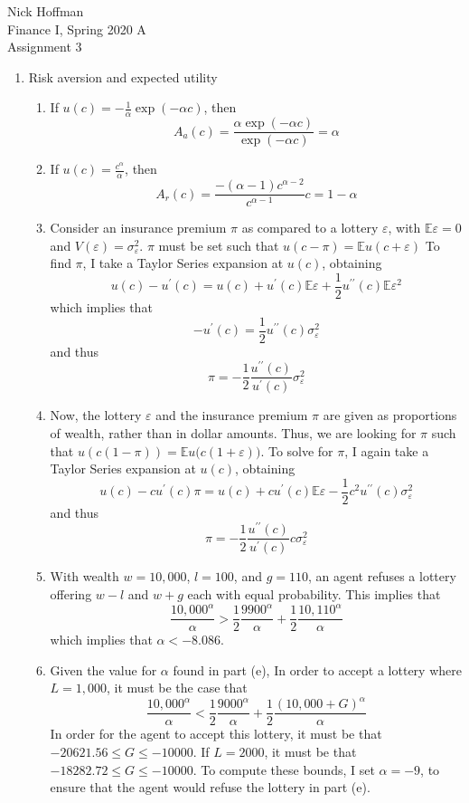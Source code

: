 \documentclass[11pt]{article}
\newcommand{\ev}{\mathbb{E}}
\begin{document}
\begin{flushleft}
	Nick Hoffman \\
	Finance I, Spring 2020 A \\
	Assignment 3 \\
\end{flushleft}

\begin{enumerate}
	\item Risk aversion and expected utility
	\begin{enumerate} 
		\item If \(u(c) = -\frac{1}{\alpha} \exp(-\alpha c)\), then
		\[A_a(c) = \frac{\alpha \exp(-\alpha c)}{\exp(-\alpha c)} = \alpha\]
		\item If \(u(c) = \frac{c^\alpha }{\alpha}\), then
		\[A_r(c) = \frac{-(\alpha - 1)c^{\alpha - 2}}{c^{\alpha - 1}}c = 1 - \alpha\]
		\item Consider an insurance premium \(\pi\) as compared to a lottery \(\varepsilon\), with \(\ev{\varepsilon} = 0\) and \(V(\varepsilon) = \sigma^2_\varepsilon\). \(\pi\) must be set such that \(u(c - \pi) = \ev{u(c + \varepsilon)}\) To find \(\pi\), I take a Taylor Series expansion at \(u(c)\), obtaining
		\[u(c) - u^\prime(c) = u(c) + u^\prime(c)\ev{\varepsilon} + \frac{1}{2}u^{\prime\prime}(c)\ev{\varepsilon^2}\]
		which implies that
		\[-u^\prime(c) = \frac{1}{2}u^{\prime\prime}(c)\sigma^2_\varepsilon\]
		and thus
		\[\pi = -\frac{1}{2}\frac{u^{\prime\prime}(c)}{u^{\prime}(c)}\sigma_\varepsilon^2\]
		\item Now, the lottery \(\varepsilon\) and the insurance premium \(\pi\) are given as proportions of wealth, rather than in dollar amounts. Thus, we are looking for \(\pi\) such that \(u(c(1 - \pi)) = \ev{u\big(c(1 + \varepsilon)\big)}\). To solve for \(\pi\), I again take a Taylor Series expansion at \(u(c)\), obtaining
		\[u(c) - c u^\prime (c)\pi = u(c) + c u^\prime (c)\ev{\varepsilon} -\frac{1}{2}c^2 u^{\prime\prime} (c)\sigma_\varepsilon^2\]
		and thus
		\[\pi = -\frac{1}{2}\frac{u^{\prime\prime}(c)}{u^{\prime}(c)} c \sigma_\varepsilon^2\]
		\item With wealth \(w = 10,000\), \(l = 100\), and \(g = 110\), an agent refuses a lottery offering \(w - l\) and \(w + g\) each with equal probability. This implies that
		\[\frac{10,000^\alpha}{\alpha} > \frac{1}{2}\frac{9900^\alpha}{\alpha} + \frac{1}{2}\frac{10,110^\alpha}{\alpha}\]
		which implies that \(\alpha < -8.086\).
		\item Given the value for \(\alpha\) found in part (e), In order to accept a lottery where \(L = 1,000\), it must be the case that 
		\[\frac{10,000^\alpha}{\alpha} < \frac{1}{2}\frac{9000^\alpha}{\alpha} + \frac{1}{2}\frac{(10,000 + G)^\alpha}{\alpha}\]
		In order for the agent to accept this lottery, it must be that \(-20621.56 \leq G \leq -10000\). If \(L = 2000\), it must be that \(-18282.72 \leq G \leq -10000\). To compute these bounds, I set \(\alpha = -9\), to ensure that the agent would refuse the lottery in part (e). 
	\end{enumerate}


\end{enumerate}
\end{document}
